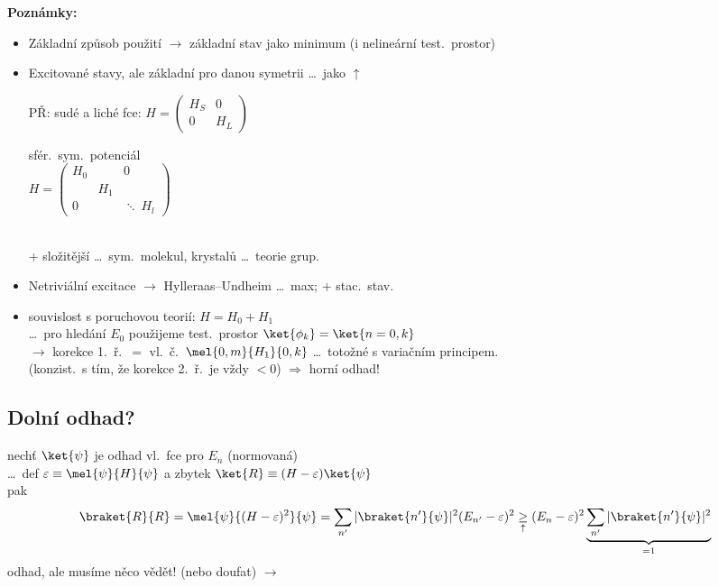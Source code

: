 \textbf{Poznámky:}
\begin{itemize}
  \item Základní způsob použití $\to$ základní stav jako minimum (i nelineární test.\ prostor)
  \item Excitované stavy, ale základní pro danou symetrii \dots\ jako $\uparrow$ \\
  \begin{minipage}[t]{0.5\textwidth}
    PŘ: sudé a liché fce: \quad
    $H = \left(\begin{array}{c|c} H_S & 0 \\ \hline 0 & H_L\end{array}\right)$
  \end{minipage}
  \begin{minipage}[t]{0.45\textwidth}\raggedright
    sfér.\ sym.\ potenciál \\
    $H = \begin{pmatrix} \boxed{H_0} & & 0 \\ & \boxed{H_1} & \\ 0 & & \ddots\ \boxed{H_l}\end{pmatrix}$
  \end{minipage} \\
  + složitější \dots\ sym.\ molekul, krystalů \dots\ teorie grup.
  \item Netriviální excitace $\to$ Hylleraas--Undheim \dots\ max; + stac.\ stav.
  \item souvislost s poruchovou teorií: \quad $H = H_0 + H_1$ \\
        \dots\ pro hledání $E_0$ použijeme test.\ prostor $\ket{\phi_k} = \ket{n=0,k}$ \\
        $\to$ korekce 1.\ ř.\ $=$ vl.\ č.\ $\mel{0,m}{H_1}{0,k}$ \dots\ totožné s variačním principem. \\
        (konzist.\ s tím, že korekce 2.\ ř.\ je vždy $< 0$) \quad $\Rightarrow$ horní odhad!
\end{itemize}

\subsection*{Dolní odhad?}
nechť $\ket{\psi}$ je odhad vl.\ fce pro $E_n$ (normovaná) \\
\dots\ def \quad $\varepsilon \equiv \mel{\psi}{H}{\psi}$ \quad a zbytek \quad $\ket{R} \equiv (H - \varepsilon)\ket{\psi}$ \\
pak
\[
  \braket{R}{R} = \mel{\psi}{(H - \varepsilon)^2}{\psi} = \sum_{n'}|\braket{n'}{\psi}|^2(E_{n'} - \varepsilon)^2
  \underset{\uparrow}{\geq} (E_n - \varepsilon)^2\underbrace{\sum_{n'}|\braket{n'}{\psi}|^2}_{=1}
\]
odhad, ale musíme něco vědět! (nebo doufat) $\to$ 

